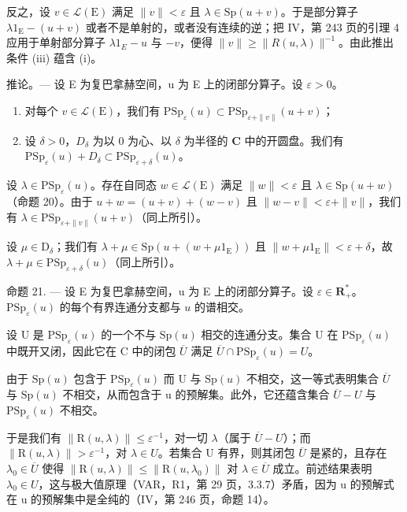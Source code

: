反之，设 \(v \in \mathcal{L}(\mathrm{E})\) 满足 \(\|v\| < \varepsilon\) 且 \(\lambda \in \mathrm{Sp}(u + v)\)。于是部分算子 \(\lambda1_{\mathrm{E}} - (u + v)\) 或者不是单射的，或者没有连续的逆；把 IV，第 243 页的引理 4 应用于单射部分算子 \(\lambda1_{E} - u\) 与 \(-v\)，便得 \(\|v\| \geqslant \|R(u, \lambda)\|^{-1}\)。由此推出条件 (iii) 蕴含 (i)。

推论。— 设 E 为复巴拿赫空间，u 为 E 上的闭部分算子。设 \(\varepsilon > 0\)。

\begin{enumerate}
\def\labelenumi{\alph{enumi})}
\item
  对每个 \(v \in \mathcal{L}(\mathrm{E})\)，我们有 \(\mathrm{PSp}_{\varepsilon}(u) \subset \mathrm{PSp}_{\varepsilon + \| v\|}(u + v)\)；
\item
  设 \(\delta > 0\)，\(D_{\delta}\) 为以 0 为心、以 \(\delta\) 为半径的 \(\mathbf{C}\) 中的开圆盘。我们有 \(\mathrm{PSp}_{\varepsilon}(u) + D_{\delta} \subset \mathrm{PSp}_{\varepsilon + \delta}(u)\)。
\end{enumerate}

设 \(\lambda \in \mathrm{PSp}_{\varepsilon}(u)\)。存在自同态 \(w \in \mathcal{L}(\mathrm{E})\) 满足 \(\|w\| < \varepsilon\) 且 \(\lambda \in \mathrm{Sp}(u+w)\)（命题 20）。由于 \(u+w = (u+v)+(w-v)\) 且 \(\|w-v\| < \varepsilon + \|v\|\)，我们有 \(\lambda \in \mathrm{PSp}_{\varepsilon+ \|v\|}(u+v)\)（同上所引）。

设 \(\mu \in \mathrm{D}_{\delta}\)；我们有 \(\lambda + \mu \in \mathrm{Sp}(u + (w + \mu 1_{\mathrm{E}}))\) 且 \(\| w + \mu 1_{\mathrm{E}} \| < \varepsilon + \delta\)，故 \(\lambda + \mu \in \mathrm{PSp}_{\varepsilon + \delta}(u)\)（同上所引）。

命题 21. --- 设 E 为复巴拿赫空间，u 为 E 上的闭部分算子。设 \(\varepsilon\in\mathbf{R}_{+}^{*}\)。\(\mathrm{PSp}_{\varepsilon}(u)\) 的每个有界连通分支都与 \(u\) 的谱相交。

设 U 是 \(\mathrm{PSp}_{\varepsilon}(u)\) 的一个不与 \(\mathrm{Sp}(u)\) 相交的连通分支。集合 U 在 \(\mathrm{PSp}_{\varepsilon}(u)\) 中既开又闭，因此它在 C 中的闭包 \(\overline{U}\) 满足 \(\overline{U} \cap \mathrm{PSp}_{\varepsilon}(u) = U\)。

由于 \(\mathrm{Sp}(u)\) 包含于 \(\mathrm{PSp}_{\varepsilon}(u)\) 而 U 与 \(\mathrm{Sp}(u)\) 不相交，这一等式表明集合 \(\overline{U}\) 与 \(\mathrm{Sp}(u)\) 不相交，从而包含于 u 的预解集。此外，它还蕴含集合 \(\overline{U}-U\) 与 \(\mathrm{PSp}_{\varepsilon}(u)\) 不相交。

于是我们有 \(\|\mathrm{R}(u,\lambda)\| \leqslant \varepsilon^{-1}\)，对一切 \(\lambda\)（属于 \(\overline{U} - U\)）；而 \(\|\mathrm{R}(u,\lambda)\| > \varepsilon^{-1}\)，对 \(\lambda \in U\)。若集合 U 有界，则其闭包 \(\overline{U}\) 是紧的，且存在 \(\lambda_{0} \in \overline{U}\) 使得 \(\|\mathrm{R}(u,\lambda)\| \leqslant \|\mathrm{R}(u,\lambda_{0})\|\) 对 \(\lambda \in \overline{U}\) 成立。前述结果表明 \(\lambda_{0} \in U\)，这与极大值原理（VAR，R1，第 29 页，3.3.7）矛盾，因为 u 的预解式在 u 的预解集中是全纯的（IV，第 246 页，命题 14）。

